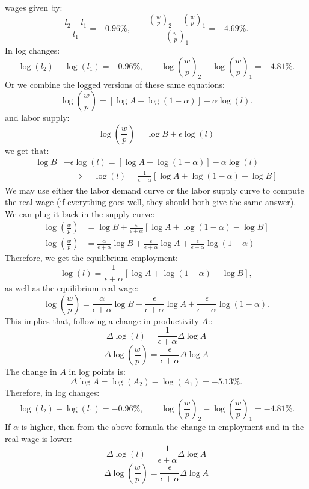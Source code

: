 \documentclass[]{book}
\theoremstyle{definition}
\theoremstyle{definition}
\theoremstyle{definition}
\theoremstyle{remark}
\begin{document}
\begin{enumerate}
  wages given by:
  \[\frac{l_2-l_1}{l_1}=-0.96\%, \qquad \frac{\left(\frac{w}{p}\right)_2-\left(\frac{w}{p}\right)_1}{\left(\frac{w}{p}\right)_1}=-4.69\%.\]
  In log changes:
  \[\log(l_2)-\log(l_1)=-0.96\%, \qquad \log\left(\frac{w}{p}\right)_2-\log\left(\frac{w}{p}\right)_1=-4.81\%.\]
  Or we combine the logged versions of these same equations:
  \[\log\left(\frac{w}{p}\right) = \left[\log A + \log(1-\alpha)\right] -\alpha \log(l).\]
  and labor supply:
  \[\log\left(\frac{w}{p}\right)=\log B + \epsilon \log(l)\] we get
  that: \[
  \begin{aligned}
  \log B &+ \epsilon \log(l) = \left[\log A + \log(1-\alpha)\right] -\alpha \log(l)\\
  & \quad \Rightarrow \quad \log(l)=\frac{1}{\epsilon + \alpha}\left[\log A + \log(1-\alpha) - \log B\right]
  \end{aligned}
  \] We may use either the labor demand curve or the labor supply curve
  to compute the real wage (if everything goes well, they should both
  give the same answer). We can plug it back in the supply curve: \[
  \begin{aligned}
  \log\left(\frac{w}{p}\right)&=\log B+\frac{\epsilon}{\epsilon + \alpha}\left[\log A + \log(1-\alpha) - \log B\right]\\
  \log\left(\frac{w}{p}\right)&=\frac{\alpha}{\epsilon+\alpha}\log B + \frac{\epsilon}{\epsilon + \alpha} \log A +\frac{\epsilon}{\epsilon + \alpha}\log(1-\alpha)
  \end{aligned}
  \] Therefore, we get the equilibrium employment:
  \[\boxed{\log(l)=\frac{1}{\epsilon + \alpha}\left[\log A + \log(1-\alpha) - \log B\right]},\]
  as well as the equilibrium real wage:
  \[\boxed{\log\left(\frac{w}{p}\right)=\frac{\alpha}{\epsilon+\alpha}\log B + \frac{\epsilon}{\epsilon + \alpha} \log A +\frac{\epsilon}{\epsilon + \alpha}\log(1-\alpha)}.\]
  This implies that, following a change in productivity \(A\)::
  \[\Delta \log(l) = \frac{1}{\epsilon+\alpha} \Delta \log A\]
  \[\Delta \log\left(\frac{w}{p}\right) = \frac{\epsilon}{\epsilon+\alpha} \Delta \log A\]
  The change in \(A\) in log points is:
  \[\Delta \log A=\log(A_2)-\log(A_1)=-5.13\%.\] Therefore, in log
  changes:
  \[\log(l_2)-\log(l_1)=-0.96\%, \qquad \log\left(\frac{w}{p}\right)_2-\log\left(\frac{w}{p}\right)_1=-4.81\%.\]
  If \(\alpha\) is higher, then from the above formula the change in
  employment and in the real wage is lower:
  \[\Delta \log(l) = \frac{1}{\epsilon+\alpha} \Delta \log A\]
  \[\Delta \log\left(\frac{w}{p}\right) = \frac{\epsilon}{\epsilon+\alpha} \Delta \log A\]

\end{enumerate}
\end{document}
